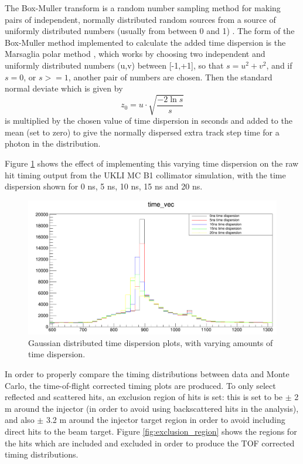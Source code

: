 The Box-Muller transform is a random number sampling method for making pairs of independent, normally distributed random sources from a source of uniformly distributed numbers (usually from between 0 and 1) \cite{10.1214/aoms/1177706645}. The form of the Box-Muller method implemented to calculate the added time dispersion is the Marsaglia polar method \cite{doi:10.1137/1006063}, which works by choosing two independent and uniformly distributed numbers (u,v) between [-1,+1], so that $s = u^{2} + v^{2}$, and if $s=0$, or $s>=1$, another pair of numbers are chosen. Then the standard normal deviate which is given by $$z_{0}=u \cdot \sqrt{\frac{-2 \ln s}{s}}$$ is multiplied by the chosen value of time dispersion in seconds and added to the mean (set to zero) to give the normally dispersed extra track step time for a photon in the distribution. 

Figure \ref{fig:gauss_time_dispersion} shows the effect of implementing this varying time dispersion on the raw hit timing output from the UKLI MC B1 collimator simulation, with the time dispersion shown for 0 ns, 5 ns, 10 ns, 15 ns and 20 ns. 

\begin{figure}
    \centering
    \includegraphics[width=\textwidth]{Figures/gauss_time_dispersion.PNG}
    \caption{Gaussian distributed time dispersion plots, with varying amounts of time dispersion.}
    \label{fig:gauss_time_dispersion}
\end{figure}

In order to properly compare the timing distributions between data and Monte Carlo, the time-of-flight corrected timing plots are produced. To only select reflected and scattered hits, an exclusion region of hits is set: this is set to be $\pm$ 2 m around the injector (in order to avoid using backscattered hits in the analysis), and also $\pm$ 3.2 m around the injector target region in order to avoid including direct hits to the beam target. Figure \ref{fig:exclusion_region} shows the regions for the hits which are included and excluded in order to produce the TOF corrected timing distributions.

